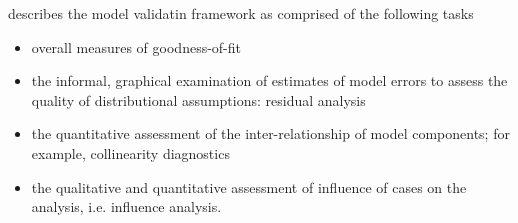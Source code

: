 \documentclass[12pt, a4paper]{article}
\begin{document}
\citet{schab} describes the model validatin framework as comprised of the following tasks
\begin{itemize}
	\item  overall measures of goodness-of-fit
	\item the informal, graphical examination of estimates of model errors to assess the quality of distributional
	assumptions: residual analysis
	
	
	\item the quantitative assessment of the inter-relationship of model components; for example, collinearity 	diagnostics
	\item the qualitative and quantitative assessment of influence of cases on the analysis, i.e. influence analysis.
\end{itemize}




\end{document}
